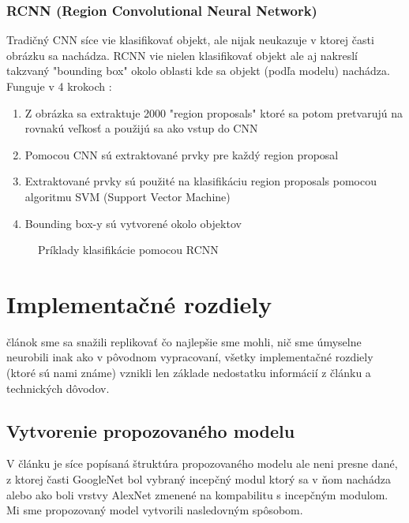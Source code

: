 \documentclass[journal,onecolumn]{IEEEtran}
\begin{document}
\subsubsection{RCNN (Region Convolutional Neural Network)}
Tradičný CNN síce vie klasifikovať objekt, ale nijak neukazuje v ktorej časti obrázku sa nachádza. RCNN vie nielen klasifikovať objekt ale aj nakreslí takzvaný "bounding box" okolo oblasti kde sa objekt (podľa modelu) nachádza. Funguje v 4 krokoch :
\begin{enumerate}
  \item Z obrázka sa extraktuje 2000 "region proposals" ktoré sa potom pretvarujú na rovnakú veľkosť a použijú sa ako vstup do CNN 
  \item Pomocou CNN sú extraktované prvky pre každý region proposal
  \item Extraktované prvky sú použité na klasifikáciu region proposals pomocou algoritmu SVM (Support Vector Machine)
  \item Bounding box-y sú vytvorené okolo objektov
\end{enumerate}

\begin{figure}[!htb]
    \centering
    \caption{Príklady klasifikácie pomocou RCNN}
    \label{fig:foobar}
\end{figure}

\newpage
\section{Implementačné rozdiely}
 článok sme sa snažili replikovať čo najlepšie sme mohli, nič sme úmyselne neurobili inak ako v pôvodnom vypracovaní, všetky implementačné rozdiely (ktoré sú nami známe) vznikli len základe nedostatku informácií z článku a technických dôvodov.

\subsection{Vytvorenie propozovaného modelu}
V článku je síce popísaná štruktúra propozovaného modelu ale neni presne dané, z ktorej časti GoogleNet bol vybraný incepčný modul ktorý sa v ňom nachádza alebo ako boli vrstvy AlexNet zmenené na kompabilitu s incepčným modulom. Mi sme propozovaný model vytvorili nasledovným spôsobom.
\end{document}

